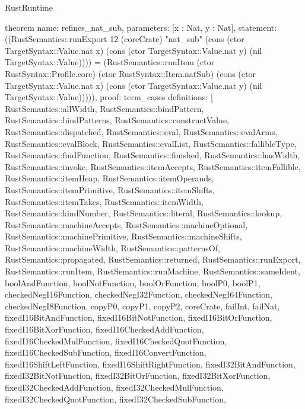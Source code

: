\begin{lexlean}{RustRuntime}
\begin{semanticmodule}
theorem{
  name: refines_nat_sub,
  parameters: [x : Nat, y : Nat],
  statement: ((RustSemantics::runExport 12 (coreCrate) "nat_sub" (cons (ctor TargetSyntax::Value.nat x) (cons (ctor TargetSyntax::Value.nat y) (nil TargetSyntax::Value)))) = (RustSemantics::runItem (ctor RustSyntax::Profile.core) (ctor RustSyntax::Item.natSub) (cons (ctor TargetSyntax::Value.nat x) (cons (ctor TargetSyntax::Value.nat y) (nil TargetSyntax::Value))))),
  proof: term_cases{
    definitions: [
      RustSemantics::allWidth,
      RustSemantics::bindPattern,
      RustSemantics::bindPatterns,
      RustSemantics::constructValue,
      RustSemantics::dispatched,
      RustSemantics::eval,
      RustSemantics::evalArms,
      RustSemantics::evalBlock,
      RustSemantics::evalList,
      RustSemantics::fallibleType,
      RustSemantics::findFunction,
      RustSemantics::finished,
      RustSemantics::hasWidth,
      RustSemantics::invoke,
      RustSemantics::itemAccepts,
      RustSemantics::itemFallible,
      RustSemantics::itemHeap,
      RustSemantics::itemOperands,
      RustSemantics::itemPrimitive,
      RustSemantics::itemShifts,
      RustSemantics::itemTakes,
      RustSemantics::itemWidth,
      RustSemantics::kindNumber,
      RustSemantics::literal,
      RustSemantics::lookup,
      RustSemantics::machineAccepts,
      RustSemantics::machineOptional,
      RustSemantics::machinePrimitive,
      RustSemantics::machineShifts,
      RustSemantics::machineWidth,
      RustSemantics::patternsOf,
      RustSemantics::propagated,
      RustSemantics::returned,
      RustSemantics::runExport,
      RustSemantics::runItem,
      RustSemantics::runMachine,
      RustSemantics::sameIdent,
      boolAndFunction,
      boolNotFunction,
      boolOrFunction,
      boolP0,
      boolP1,
      checkedNegI16Function,
      checkedNegI32Function,
      checkedNegI64Function,
      checkedNegI8Function,
      copyP0,
      copyP1,
      copyP2,
      coreCrate,
      failInt,
      failNat,
      fixedI16BitAndFunction,
      fixedI16BitNotFunction,
      fixedI16BitOrFunction,
      fixedI16BitXorFunction,
      fixedI16CheckedAddFunction,
      fixedI16CheckedMulFunction,
      fixedI16CheckedQuotFunction,
      fixedI16CheckedSubFunction,
      fixedI16ConvertFunction,
      fixedI16ShiftLeftFunction,
      fixedI16ShiftRightFunction,
      fixedI32BitAndFunction,
      fixedI32BitNotFunction,
      fixedI32BitOrFunction,
      fixedI32BitXorFunction,
      fixedI32CheckedAddFunction,
      fixedI32CheckedMulFunction,
      fixedI32CheckedQuotFunction,
      fixedI32CheckedSubFunction,
}}
\end{semanticmodule}
\end{lexlean}

